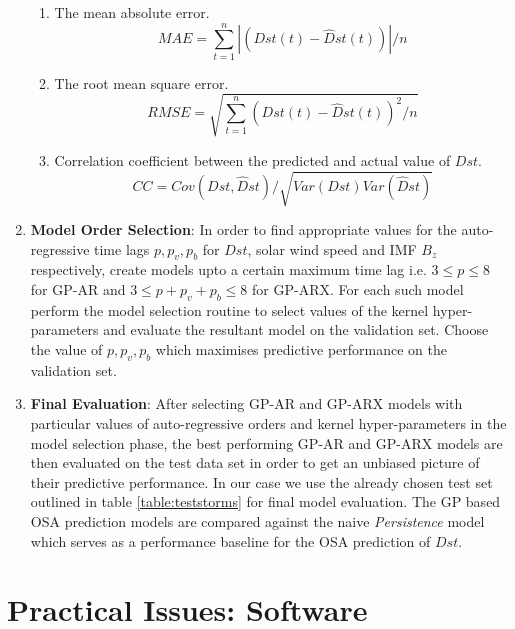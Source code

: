 \documentclass{article}
\begin{document}
\begin{enumerate}
\begin{enumerate}
    \item The mean absolute error.
    \begin{equation}
        MAE = \sum_{t=1}^{n} \left |(Dst(t) - \hat{D}st(t)) \right | / n
    \end{equation}
    \item The root mean square error.
    \begin{equation}
        RMSE = \sqrt{\sum_{t=1}^{n} (Dst(t) - \hat{D}st(t))^2 / n}
    \end{equation}
    \item Correlation coefficient between the predicted and actual value of $Dst$.
    \begin{equation}
        CC = Cov(Dst, \hat{D}st)/\sqrt{Var(Dst) Var(\hat{D}st)}
    \end{equation}
\end{enumerate}


\item \textbf{Model Order Selection}: In order to find appropriate values for the auto-regressive time lags $p, p_v, p_b$ for $Dst$, solar wind speed and IMF $B_z$ respectively, create models upto a certain maximum time lag i.e. $3 \leq p \leq 8$ for GP-AR and $3 \leq p + p_v + p_b \leq 8$ for GP-ARX. For each such model perform the model selection routine to select values of the kernel hyper-parameters and evaluate the resultant model on the validation set. Choose the value of $p, p_v, p_b$ which maximises predictive performance on the validation set.

\item \textbf{Final Evaluation}: After selecting GP-AR and GP-ARX models with particular values of auto-regressive orders and kernel hyper-parameters in the model selection phase, the best performing GP-AR and GP-ARX models are then evaluated on the test data set in order to get an unbiased picture of their predictive performance. In our case we use the already chosen test set outlined in table \ref{table:teststorms} for final model evaluation. The GP based OSA prediction models are compared against the naive \emph{Persistence} model which serves as a performance baseline for the OSA prediction of $Dst$.

\end{enumerate}

\section{Practical Issues: Software}
 
\end{document}

